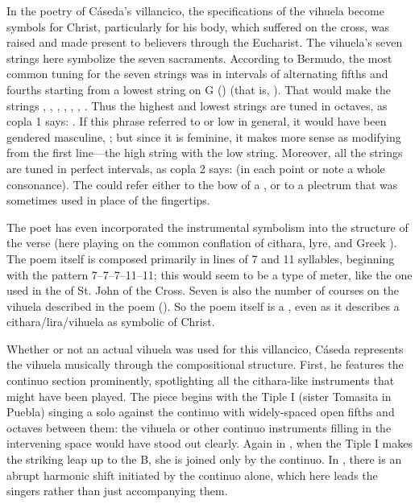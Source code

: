 In the poetry of Cáseda's villancico, the specifications of the vihuela become
symbols for Christ, particularly for his body, which suffered on the cross, was
raised and made present to believers through the Eucharist.
The vihuela's seven strings here symbolize the seven sacraments.
According to Bermudo, the most common tuning for the seven strings was in
intervals of alternating fifths and fourths starting from a lowest string on G
() (that is, ).%
    \autocite[109r--109v]{Bermudo:Declaracion}
That would make the strings , , ,
, , , .
Thus the highest and lowest strings are tuned in octaves, as copla 1 says:
.
If this phrase referred to  or low in general, it
would have been gendered masculine, ; but since it
is feminine, it makes more sense as modifying  from the first
line---the high string with the low string.
Moreover, all the strings are tuned in perfect intervals, as copla 2 says:
 (in each point or note a whole
consonance).
The  could refer either to the bow of a , or
to a plectrum that was sometimes used in place of the fingertips.

The poet has even incorporated the instrumental symbolism into the structure of
the verse (here playing on the common conflation of cithara, lyre, and Greek
).
The poem itself is composed primarily in lines of 7 and 11 syllables, beginning
with the pattern 7--7--7--11--11; this would seem to be a type of 
meter, like the one used in the  of St. John of the
Cross.
Seven is also the number of courses on the vihuela described in the poem
().
So the poem itself is a , even as it describes a
cithara/lira/vihuela as symbolic of Christ.

Whether or not an actual vihuela was used for this villancico, Cáseda
represents the vihuela musically through the compositional structure.
First, he features the continuo section prominently, spotlighting all the
cithara-like instruments that might have been played.
The piece begins with the Tiple I (sister Tomasita in Puebla) singing a solo
against the continuo with widely-spaced open fifths and octaves between them:
the vihuela or other continuo instruments filling in the intervening space
would have stood out clearly.
Again in , when the Tiple I makes the striking leap up to the
B\fl{}, she is joined only by the continuo.
In , there is an abrupt harmonic shift initiated by the continuo
alone, which here leads the singers rather than just accompanying them.

